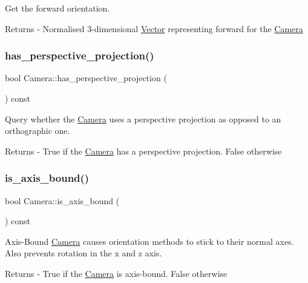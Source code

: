 Get the forward orientation. \begin{DoxyReturn}{Returns}
-\/ Normalised 3-\/dimensional \mbox{\hyperlink{class_vector}{Vector}} representing \textquotesingle{}forward\textquotesingle{} for the \mbox{\hyperlink{class_camera}{Camera}} 
\end{DoxyReturn}
\mbox{\label{class_camera_a0faf690094effa7365ada339b6cb1751}} 
\subsubsection{\texorpdfstring{has\+\_\+perspective\+\_\+projection()}{has\_perspective\_projection()}}
{\footnotesize\ttfamily bool Camera\+::has\+\_\+perspective\+\_\+projection (\begin{DoxyParamCaption}{ }\end{DoxyParamCaption}) const}

Query whether the \mbox{\hyperlink{class_camera}{Camera}} uses a perspective projection as opposed to an orthographic one. \begin{DoxyReturn}{Returns}
-\/ True if the \mbox{\hyperlink{class_camera}{Camera}} has a perspective projection. False otherwise 
\end{DoxyReturn}
\mbox{\label{class_camera_a2c0432bd7e7e47d0e90d0fdf7d99a798}} 
\subsubsection{\texorpdfstring{is\+\_\+axis\+\_\+bound()}{is\_axis\_bound()}}
{\footnotesize\ttfamily bool Camera\+::is\+\_\+axis\+\_\+bound (\begin{DoxyParamCaption}{ }\end{DoxyParamCaption}) const}

Axis-\/\+Bound \mbox{\hyperlink{class_camera}{Camera}} causes orientation methods to stick to their normal axes. Also prevents rotation in the x and z axis. \begin{DoxyReturn}{Returns}
-\/ True if the \mbox{\hyperlink{class_camera}{Camera}} is axis-\/bound. False otherwise 
\end{DoxyReturn}
\mbox{\label{class_camera_a5321fe15cd196021eea531de71f41e14}} 
